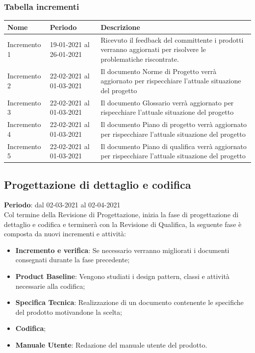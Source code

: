 	\subsubsection{Tabella incrementi}
		\begin{center}
    			\begin{tabular}{ | l | p{5cm} | p{8cm} |}
   			 \hline
    			Nome & Periodo & Descrizione \\ \hline
    			Incremento 1 & 19-01-2021 al 26-01-2021 & Ricevuto il feedback del committente i prodotti verranno aggiornati per risolvere le problematiche riscontrate. \\ \hline
    			Incremento 2 & 22-02-2021 al 01-03-2021 & Il documento Norme di Progetto verrà aggiornato per rispecchiare l'attuale situazione del progetto \\ \hline
    			Incremento 3 & 22-02-2021 al 01-03-2021 & Il documento Glossario verrà aggiornato per rispecchiare l'attuale situazione del progetto \\ \hline
			Incremento 4 & 22-02-2021 al 01-03-2021 & Il documento Piano di progetto verrà aggiornato per rispecchiare l'attuale situazione del progetto \\ \hline
			Incremento 5 & 22-02-2021 al 01-03-2021 & Il documento Piano di qualifica verrà aggiornato per rispecchiare l'attuale situazione del progetto \\ \hline
    			\end{tabular}
		\end{center}
	
	\subsection{Progettazione di dettaglio e codifica}
	\textbf{Periodo}: dal 02-03-2021 al 02-04-2021 \\
	Col termine della Revisione di Progettazione, inizia la fase di progettazione di dettaglio e codifica e terminerà con la Revisione di Qualifica, la seguente fase è composta da nuovi incrementi e attività:
	\begin{itemize}
		\item \textbf{Incremento e verifica}: Se necessario verranno migliorati i documenti consegnati durante la fase precedente;
		\item \textbf{Product Baseline}: Vengono studiati i design pattern, classi e attività necessarie alla codifica;
		\item \textbf{Specifica Tecnica}: Realizzazione di un documento contenente le specifiche del prodotto motivandone la scelta;
		\item \textbf{Codifica};
		\item \textbf{Manuale Utente}: Redazione del manuale utente del prodotto.
	\end{itemize}
	
